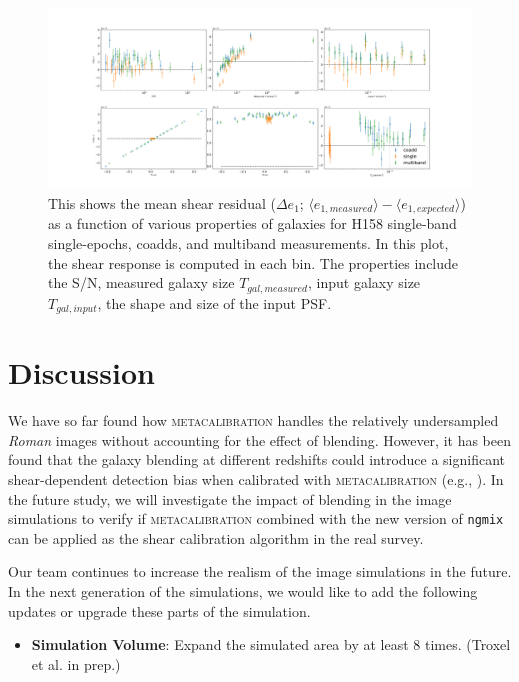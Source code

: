 {\begin{figure}
    \hspace*{-3.5cm}
    \centering
	\includegraphics[scale=0.34]{H158_meanshear_measured_properties_perbin_e1.pdf}
    \caption{This shows the mean shear residual ($\Delta e_{1}$; $\langle e_{1,measured} \rangle - \langle e_{1,expected} \rangle$) as a function of various properties of galaxies for H158 single-band single-epochs, coadds, and multiband measurements. In this plot, the shear response is computed in each bin. The properties include the S/N, measured galaxy size $T_{gal,measured}$, input galaxy size $T_{gal,input}$, the shape and size of the input PSF.}
    \label{fig:meanshear}
\end{figure}


\section{Discussion}
\label{sec:discussion}

We have so far found how \textsc{metacalibration} handles the relatively undersampled \emph{Roman} images without accounting for the effect of blending. However, it has been found that the galaxy blending at different redshifts could introduce a significant shear-dependent detection bias when calibrated with \textsc{metacalibration} (e.g., \citealt{2020ApJ...902..138S}). In the future study, we will investigate the impact of blending in the image simulations to verify if \textsc{metacalibration} combined with the new version of \texttt{ngmix} can be applied as the shear calibration algorithm in the real survey. 

Our team continues to increase the realism of the image simulations in the future. In the next generation of the simulations, we would like to add the following updates or upgrade these parts of the simulation. 
\begin{itemize}
    \setlength\itemsep{1em}
    \item \textbf{Simulation Volume}: Expand the simulated area by at least 8 times. (Troxel et al. in prep.)
    

\end{itemize}}
